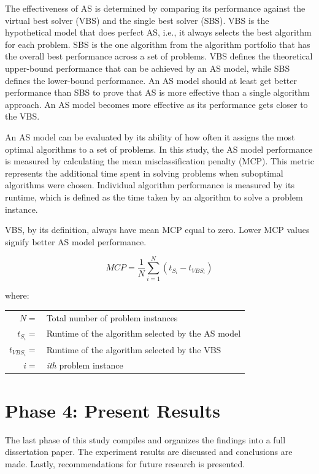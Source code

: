 The effectiveness of AS is determined by comparing its performance against the virtual best solver (VBS) and the single best solver (SBS). VBS is the hypothetical model that does perfect AS, i.e., it always selects the best algorithm for each problem. SBS is the one algorithm from the algorithm portfolio that has the overall best performance across a set of problems. VBS defines the theoretical upper-bound performance that can be achieved by an AS model, while SBS defines the lower-bound performance. An AS model should at least get better performance than SBS to prove that AS is more effective than a single algorithm approach. An AS model becomes more effective as its performance gets closer to the VBS.

An AS model can be evaluated by its ability of how often it assigns the most optimal algorithms to a set of problems. In this study, the AS model performance is measured by calculating the mean misclassification penalty (MCP). This metric represents the additional time spent in solving problems when suboptimal algorithms were chosen. Individual algorithm performance is measured by its runtime, which is defined as the time taken by an algorithm to solve a problem instance. 

VBS, by its definition, always have mean MCP equal to zero. Lower MCP values signify better AS model performance. 


\begin{equation}
MCP = \frac{1}{N}\sum_{i=1}^{N}(t_{S_{i}} - t_{VBS_{i}})
\label{eq:mcp}
\end{equation}

where:

\begin{table}[H]
	\centering
	\begin{tabular}{rl}
		$N =$ & Total number of problem instances \\
		$t_{S_i} =$ & Runtime of the algorithm selected by the AS model \\
		$t_{VBS_i} =$ & Runtime of the algorithm selected by the VBS \\
		$i =$ & \textit{ith} problem instance
	\end{tabular}
\end{table}

\section{Phase 4: Present Results}

The last phase of this study compiles and organizes the findings into a full dissertation paper. The experiment results are discussed and conclusions are made. Lastly, recommendations for future research is presented.